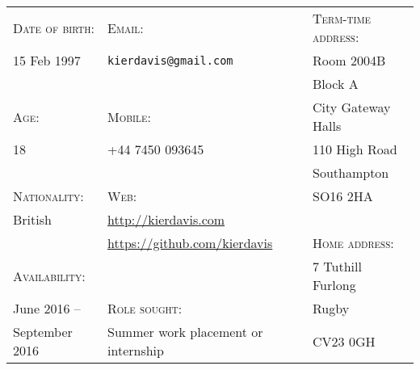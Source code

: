 \vspace{-1em}
\hrulefill
\vspace{1em}

{
\newcommand{\h}[1]{\textsc{#1}:}
\newcommand{\n}[1]{\hspace{.8em} #1}
\begin{tabu} to \textwidth {X[1.3,l] X[2.5,l] X[1.5,l]}
    \h{Date of birth}  & \h{Email}                                 & \h{Term-time address}  \\
    \n{15 Feb 1997}    & \n{\texttt{kierdavis@gmail.com}}          & \n{Room 2004B}         \\
                       &                                           & \n{Block A}            \\
    \h{Age}            & \h{Mobile}                                & \n{City Gateway Halls} \\
    \n{18}             & \n{+44 7450 093645}                       & \n{110 High Road}      \\
                       &                                           & \n{Southampton}        \\
    \h{Nationality}    & \h{Web}                                   & \n{SO16 2HA}           \\
    \n{British}        & \n{\url{http://kierdavis.com}}            &                        \\
                       & \n{\url{https://github.com/kierdavis}}    & \h{Home address}       \\
    \h{Availability}   &                                           & \n{7 Tuthill Furlong}  \\
    \n{June 2016 --}   & \h{Role sought}                           & \n{Rugby}              \\
    \n{September 2016} & \n{Summer work placement or internship}   & \n{CV23 0GH}           \\
\end{tabu}
}

\vspace{1em}
\hrulefill
